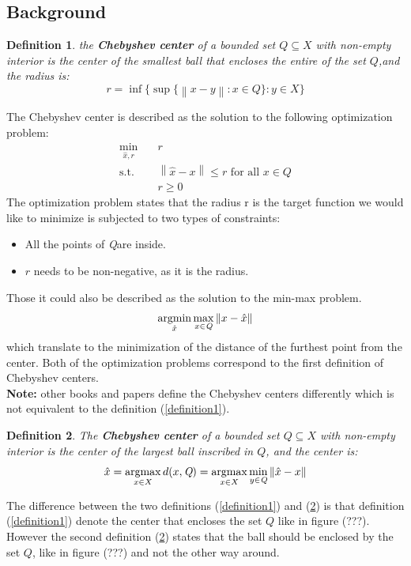 \documentclass[]{article}
\newtheorem{definition}{Definition}[]
\newcommand{\norm}[1]{\left\lVert#1\right\rVert}
\newcommand{\Q}[0]{\textit{Q}}
\DeclareMathOperator*{\argmax}{argmax}
\DeclareMathOperator*{\argmin}{argmin}
\begin{document}
\subsection{Background}
\begin{definition}
	the \textbf{Chebyshev center}\cite{convexOptimization} of a bounded set $\textit{Q}\subseteq X$ with non-empty interior is the center of the smallest ball that encloses the entire of the set $\Q$,and the radius is:
	\begin{equation*}
		r=\inf\{\sup\{\norm{x-y}:x\in\Q\}:y\in X\}
	\end{equation*}
\end{definition}
The Chebyshev center is described as the solution to the following optimization problem:
\begin{equation}
	\label{OP1}
	\begin{aligned}
		\min_{\hat{x},r} \quad &r \\
		\text{s.t.}\quad &\norm{\hat{x} - x} \leq r \text{ for all }x\in\Q \\
		\quad & r\geq 0
	\end{aligned}
\end{equation}
The optimization problem states that the radius r is the target function we would like to minimize is subjected to two types of constraints:
\begin{itemize}
	\item All the points of \Q are inside.
	\item $r$ needs to be non-negative, as it is the radius.
\end{itemize}
Those it could also be described as the solution to the min-max problem.
\begin{equation}
	\label{OP2}
	\argmin_{\hat{x}} \max_{x\in\Q} \space \norm{x-\hat{x}}
\end{equation}
which translate to the minimization of the distance of the furthest point from the center. Both of the optimization problems correspond to the first definition of Chebyshev centers.\\
\textbf{Note:} other books and papers\cite{ParametricOptimization} define the Chebyshev centers differently which is not equivalent to the definition (\ref{definition1}).
\begin{definition}
	\label{definition2}
	The \textbf{Chebyshev center} of a bounded set $\Q\subseteq X$ with non-empty interior is the center of the largest ball inscribed in $\Q$, and the center is:
	\begin{equation}	
		\hat{x}=\argmax_{x\in X}\space d(x,\Q) = \argmax_{x\in X} \space \min_{y\in \Q} \norm{\hat{x} - x}
	\end{equation}
\end{definition}
The difference between the two definitions (\ref{definition1}) and (\ref{definition2}) is that definition (\ref{definition1}) denote the center that encloses the set $\Q$ like in figure (???). However the second definition (\ref{definition2}) states that the ball should be enclosed by the set $\Q$, like in figure (???) and not the other way around.
\end{document}
